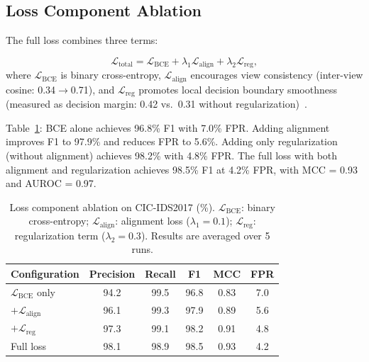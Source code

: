 \documentclass[conference]{IEEEtran}
\begin{document}
\subsection{Loss Component Ablation}
The full loss combines three terms:

\begin{equation}
\mathcal{L}_{\text{total}} = \mathcal{L}_{\text{BCE}} + \lambda_1 \mathcal{L}_{\text{align}} + \lambda_2 \mathcal{L}_{\text{reg}},
\end{equation}
where $\mathcal{L}_{\text{BCE}}$ is binary cross-entropy, $\mathcal{L}_{\text{align}}$ encourages view consistency (inter-view cosine: 0.34$\to$0.71), and $\mathcal{L}_{\text{reg}}$ promotes local decision boundary smoothness (measured as decision margin: 0.42 vs.\ 0.31 without regularization)~\cite{gombar2026cost}.

Table~\ref{tab:loss_ablation}: BCE alone achieves 96.8\% F1 with 7.0\% FPR. Adding alignment improves F1 to 97.9\% and reduces FPR to 5.6\%. Adding only regularization (without alignment) achieves 98.2\% with 4.8\% FPR. The full loss with both alignment and regularization achieves 98.5\% F1 at 4.2\% FPR, with MCC = 0.93 and AUROC = 0.97.

\begin{table}[t]
\caption{Loss component ablation on CIC-IDS2017 (\%). $\mathcal{L}_{\text{BCE}}$: binary cross-entropy; $\mathcal{L}_{\text{align}}$: alignment loss ($\lambda_1=0.1$); $\mathcal{L}_{\text{reg}}$: regularization term ($\lambda_2=0.3$). Results are averaged over 5 runs.}
\label{tab:loss_ablation}
\centering
\scriptsize

\begin{tabular}{lccccc}
\toprule
Configuration & Precision & Recall & F1 & MCC & FPR \\

\midrule
$\mathcal{L}_{\text{BCE}}$ only & 94.2 & 99.5 & 96.8 & 0.83 & 7.0 \\

$+ \mathcal{L}_{\text{align}}$ & 96.1 & 99.3 & 97.9 & 0.89 & 5.6 \\

$+ \mathcal{L}_{\text{reg}}$ & 97.3 & 99.1 & 98.2 & 0.91 & 4.8 \\

Full loss & 98.1 & 98.9 & 98.5 & 0.93 & 4.2 \\

\bottomrule
\end{tabular}

\end{table}
\end{document}
